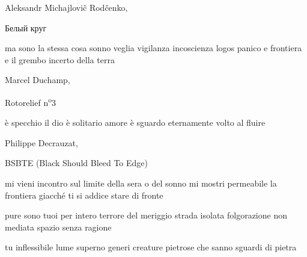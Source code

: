 \begin{volumetitlepage}
\end{volumetitlepage}


\begin{artItem}
	Aleksandr Michajlovič Rodčenko, \begin{otherlanguage}{russian}%
		Белый круг%
	\end{otherlanguage}
\end{artItem}

\begin{poem}
	\begin{stanza}
		ma sono la stessa cosa\verseline
		sonno veglia\verseline
		vigilanza incoscienza\verseline
		logos panico\verseline
		e frontiera\verseline
		e il grembo incerto\verseline
		della terra
	\end{stanza}
\end{poem}

\clearpage


\begin{artItem}
	Marcel Duchamp, \begin{otherlanguage}{french}%
		Rotorelief n\textsuperscript{o}3%
	\end{otherlanguage}
\end{artItem}

\begin{poem}
	\begin{stanza}
		è specchio il dio\verseline
		è solitario amore\verseline
		è sguardo eternamente\verseline
		volto al fluire
	\end{stanza}
\end{poem}

\clearpage


\begin{artItem}
	Philippe Decrauzat, \begin{otherlanguage}{english}%
		BSBTE (Black Should Bleed To Edge)%
	\end{otherlanguage}
\end{artItem}

\begin{poem}
	\begin{stanza}
		mi vieni incontro sul limite\verseline
		della sera o del sonno\verseline
		mi mostri permeabile\verseline
		la frontiera\verseline
		giacché ti si addice\verseline
		stare di fronte
	\end{stanza}

	\begin{stanza}
		pure sono tuoi per intero\verseline
		terrore del meriggio\verseline
		strada isolata\verseline
		folgorazione non mediata\verseline
		spazio senza ragione
	\end{stanza}

	\begin{stanza}
		tu inflessibile\verseline
		lume superno\verseline
		generi creature\verseline
		pietrose\verseline
		che sanno sguardi\verseline
		di pietra
	\end{stanza}
\end{poem}

